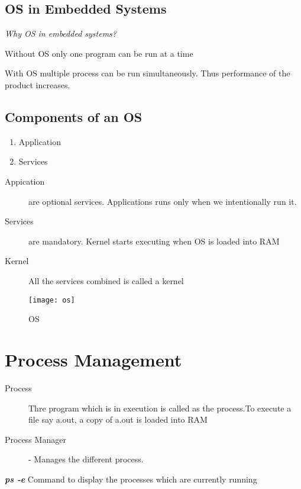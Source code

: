 \documentclass[11pt,fleqn]{book} %
\begin{document}
\section{OS in Embedded Systems}
\textit{Why OS in embedded systems?}

Without OS only one program can be run at a time

With OS multiple process can be run simultaneously. Thus performance of the product increases.

\section{Components of an OS}
\begin{enumerate}
	\item Application
	\item Services
\end{enumerate}

\begin{description}
 \item[Appication] are optional services. Applications runs only when we intentionally run it. 
 \item[Services] are mandatory. Kernel starts executing when OS is loaded into RAM 
 \item[Kernel] All the services combined is called a kernel
\end{description}

\begin{figure}[h]
\centering\texttt{[image: os]}
\caption{OS}
\end{figure}

\chapter{Process Management}

\begin{description}
	\item [Process] Thre program which is in execution is called as the process.To execute a file say a.out, a copy of a.out is loaded into RAM
	\item [Process Manager] - Manages the different process. 
\end{description}


\begin{myremark}{}
\textit{\textbf{ps -e}} Command to display the processes which are currently running
\end{myremark}
\end{document}
